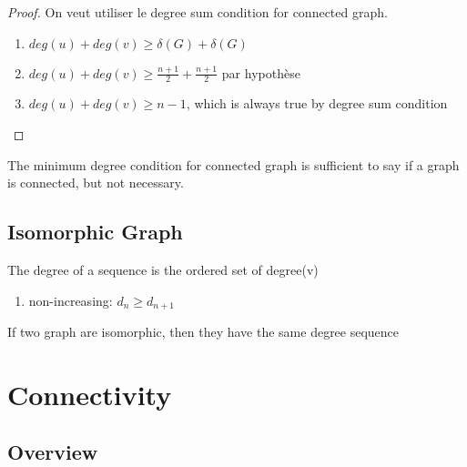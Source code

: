 \documentclass{article}
\begin{document}
\begin{proof}
    On veut utiliser le degree sum condition for connected graph.
    \begin{enumerate}
	\item $deg(u)+deg(v) \geq \delta(G)+\delta(G)$
	\item $deg(u)+deg(v) \geq \frac{n+1}{2} + \frac{n+1}{2} $
	    par hypothèse
	\item $deg(u)+deg(v) \geq n-1$, which is always true by degree
	    sum condition
    \end{enumerate}
\end{proof}

\begin{remark}
    The minimum degree condition for connected graph is sufficient to say
    if a graph is connected, but not necessary.
\end{remark}

\subsection{Isomorphic Graph}%
\label{sub:Isomorphic Graph}

\begin{definition}

\end{definition}


\begin{definition}
    The degree of a sequence is the ordered set of degree(v)
    \begin{enumerate}
	\item non-increasing: $ d_n \geq d_{n+1}$
    \end{enumerate}
\end{definition}

\begin{theorem}
    If two graph  are isomorphic, then they have the same degree sequence
\end{theorem}



\section{Connectivity}

\subsection{Overview}%
\label{sub:Overview}
\end{document}
